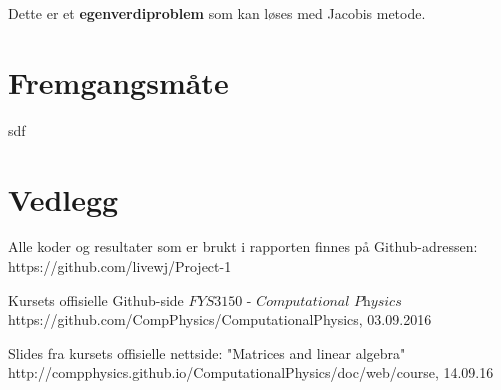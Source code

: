 \documentclass{article}
\begin{document}
Dette er et \textbf{egenverdiproblem} som kan løses med Jacobis metode. 

\section{Fremgangsmåte}
sdf



\section{Vedlegg}
Alle koder og resultater som er brukt i rapporten finnes på Github-adressen: https://github.com/livewj/Project-1




\begin{thebibliography}{9}

  Kursets offisielle Github-side $\textit{FYS3150 - Computational Physics}$
  https://github.com/CompPhysics/ComputationalPhysics,
  03.09.2016  
  
\bibitem{}
  Slides fra kursets offisielle nettside: "Matrices and linear algebra" http://compphysics.github.io/ComputationalPhysics/doc/web/course, 14.09.16
  
\bibitem{}
  
    
\end{thebibliography}
\end{document}
